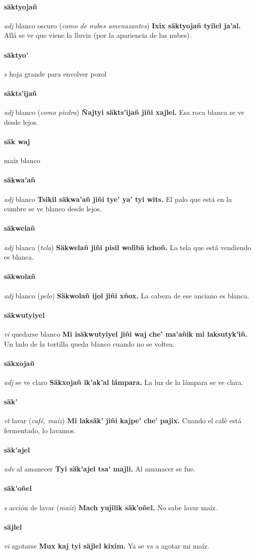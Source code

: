 \documentclass{scrbook}
\newcommand{\entry}[1]{\paragraph{#1}}
\newcommand{\partofspeech}[1]{\textit{#1}}
\newcommand{\spanishtranslation}[1]{#1}
\newcommand{\clarification}[1]{(\textit{#1})}
\newcommand{\cholexample}[1]{\textbf{#1}}
\newcommand{\exampletranslation}[1]{#1}
\begin{document}
\begin{multicols}{2}
\entry{säktyojañ}
\partofspeech{adj}
\spanishtranslation{blanco oscuro}
\clarification{como de nubes amenazantes}
\cholexample{Ixix säktyojañ tyilel ja'al.}
\exampletranslation{Allá se ve que viene la lluvia (por la apariencia de las nubes).}

\entry{säktyo'}
\partofspeech{s}
\spanishtranslation{hoja grande para envolver pozol}

\entry{säkts'ijañ}
\partofspeech{adj}
\spanishtranslation{blanco}
\clarification{como piedra}
\cholexample{Ñajtyi säkts'ijañ jiñi xajlel.}
\exampletranslation{Esa roca blanca se ve desde lejos.}

\entry{säk waj}
\spanishtranslation{maíz blanco}

\entry{säkwa'añ}
\partofspeech{adj}
\spanishtranslation{blanco}
\cholexample{Tsikil säkwa'añ jiñi tye' ya' tyi wits.}
\exampletranslation{El palo que está en la cumbre se ve blanco desde lejos.}

\entry{säkwelañ}
\partofspeech{adj}
\spanishtranslation{blanca}
\clarification{tela}
\cholexample{Säkwelañ jiñi pisil wolibä ichoñ.}
\exampletranslation{La tela que está vendiendo es blanca.}

\entry{säkwolañ}
\partofspeech{adj}
\spanishtranslation{blanco}
\clarification{pelo}
\cholexample{Säkwolañ ijol jiñi xñox.}
\exampletranslation{La cabeza de ese anciano es blanca.}

\entry{säkwutyiyel}
\partofspeech{vi}
\spanishtranslation{quedarse blanco}
\cholexample{Mi isäkwutyiyel jiñi waj che' ma'añik mi laksutyk'iñ.}
\exampletranslation{Un lado de la tortilla queda blanco cuando no se voltea.}

\entry{säkxojañ}
\partofspeech{adj}
\spanishtranslation{se ve claro}
\cholexample{Säkxojañ ik'ak'al lámpara.}
\exampletranslation{La luz de la lámpara se ve clara.}

\entry{säk'}
\partofspeech{vt}
\spanishtranslation{lavar}
\clarification{café, maíz}
\cholexample{Mi laksäk' jiñi kajpe' che' pajix.}
\exampletranslation{Cuando el café está fermentado, lo lavamos.}

\entry{säk'ajel}
\partofspeech{adv}
\spanishtranslation{al amanecer}
\cholexample{Tyi säk'ajel tsa' majli.}
\exampletranslation{Al amanacer se fue.}

\entry{säk'oñel}
\partofspeech{s}
\spanishtranslation{acción de lavar}
\clarification{maíz}
\cholexample{Mach yujilik säk'oñel.}
\exampletranslation{No sabe lavar maíz.}

\entry{säjlel}
\partofspeech{vi}
\spanishtranslation{agotarse}
\cholexample{Mux kaj tyi säjlel kixim.}
\exampletranslation{Ya se va a agotar mi maíz.}


\end{multicols}
\end{document}
